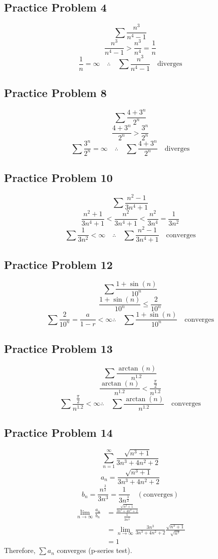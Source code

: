 \documentclass[letterpaper, 12pt]{math}
\begin{document}
\subsection*{Practice Problem 4}
\[ \sum\frac{n^{3}}{n^{4}-1} \]
\[ \frac{n^{3}}{n^{4}-1} > \frac{n^{3}}{n^{4}} = \frac{1}{n} \]
\[ \frac{1}{n} = \infty \quad \therefore \quad \sum\frac{n^{3}}{n^{4}-1}
   \quad \mathrm{diverges} \]

\subsection*{Practice Problem 8}
\[ \sum\frac{4+3^{n}}{2^{n}} \]
\[ \frac{4+3^{n}}{2^{n}} > \frac{3^{n}}{2^{n}} \]
\[ \sum\frac{3^{n}}{2^{n}} = \infty \quad \therefore \quad
   \sum\frac{4+3^{n}}{2^{n}} \quad \mathrm{diverges} \]

\subsection*{Practice Problem 10}
\[ \sum\frac{n^{2}-1}{3n^{4}+1} \]
\[ \frac{n^{2}+1}{3n^{4}+1} < \frac{n^{2}}{3n^{4}+1} < \frac{n^{2}}{3n^{4}} =
   \frac{1}{3n^{2}} \]
\[ \sum\frac{1}{3n^{2}} < \infty \quad \therefore \quad
   \sum\frac{n^{2}-1}{3n^{4}+1} \quad \mathrm{converges} \]

\subsection*{Practice Problem 12}
\[ \sum\frac{1+\sin(n)}{10^{n}} \]
\[ \frac{1+\sin(n)}{10^{n}} \leq \frac{2}{10^{n}} \]
\[ \sum\frac{2}{10^{n}} = \frac{a}{1-r} < \infty
   \therefore \quad \sum\frac{1+\sin(n)}{10^{n}} \quad \mathrm{converges} \]

\subsection*{Practice Problem 13}
\[ \sum\frac{\arctan(n)}{n^{1.2}} \]
\[ \frac{\arctan(n)}{n^{1.2}} < \frac{\frac{\pi}{2}}{n^{1.2}} \]
\[ \sum\frac{\frac{\pi}{2}}{n^{1.2}} < \infty
   \therefore \quad \sum\frac{\arctan(n)}{n^{1.2}} \quad \mathrm{converges} \]

\subsection*{Practice Problem 14}
\[ \sum_{n=1}^{\infty}\frac{\sqrt{n^{3}+1}}{3n^{3}+4n^{2}+2} \]
\[ a_{n} = \frac{\sqrt{n^{3}+1}}{3n^{3}+4n^{2}+2} \]
\[ b_{n} = \frac{n^{\frac{3}{2}}}{3n^{3}} = \frac{1}{3n^{\frac{3}{2}}}
   \quad \mathrm{(converges)} \]
\begin{align*}
  \lim_{n\to\infty}\frac{a_{n}}{b_{n}} &=
    \frac{\frac{\sqrt{n^{3}+1}}{3n^{3}+4n^{2}+2}}
    {\frac{1}{3n^{\frac{3}{2}}}} \\
  &= \lim_{n\to\infty}\frac{3n^{3}}{3n^{3}+4n^{2}+2}
    \frac{\sqrt{n^{3}+1}}{\sqrt{n^{3}}} \\
  &= 1
\end{align*}
Therefore, \( \sum{a_{n}} \) converges (p-series test).
\end{document}
